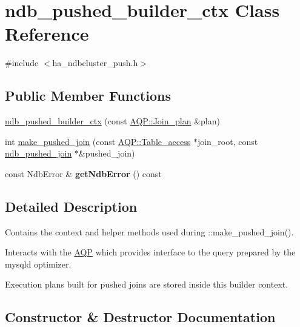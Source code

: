 \hypertarget{classndb__pushed__builder__ctx}{}\section{ndb\+\_\+pushed\+\_\+builder\+\_\+ctx Class Reference}
\label{classndb__pushed__builder__ctx}


{\ttfamily \#include $<$ha\+\_\+ndbcluster\+\_\+push.\+h$>$}

\subsection*{Public Member Functions}
\begin{DoxyCompactItemize}
\item 
\mbox{\hyperlink{classndb__pushed__builder__ctx_aeaeb480eb16ba0f713d151e0140b284d}{ndb\+\_\+pushed\+\_\+builder\+\_\+ctx}} (const \mbox{\hyperlink{classAQP_1_1Join__plan}{A\+Q\+P\+::\+Join\+\_\+plan}} \&plan)
\item 
int \mbox{\hyperlink{classndb__pushed__builder__ctx_a9472b36f6733ba8df3f8fd2563025cb1}{make\+\_\+pushed\+\_\+join}} (const \mbox{\hyperlink{classAQP_1_1Table__access}{A\+Q\+P\+::\+Table\+\_\+access}} $\ast$join\+\_\+root, const \mbox{\hyperlink{classndb__pushed__join}{ndb\+\_\+pushed\+\_\+join}} $\ast$\&pushed\+\_\+join)
\item 
\mbox{\label{classndb__pushed__builder__ctx_a944f64d4d67eb15ce7ad46b03a478b44}} 
const Ndb\+Error \& {\bfseries get\+Ndb\+Error} () const
\end{DoxyCompactItemize}


\subsection{Detailed Description}
Contains the context and helper methods used during \+::make\+\_\+pushed\+\_\+join().

Interacts with the \mbox{\hyperlink{namespaceAQP}{A\+QP}} which provides interface to the query prepared by the mysqld optimizer.

Execution plans built for pushed joins are stored inside this builder context. 

\subsection{Constructor \& Destructor Documentation}
\mbox{\label{classndb__pushed__builder__ctx_aeaeb480eb16ba0f713d151e0140b284d}} 

